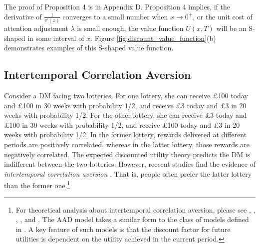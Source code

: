 \documentclass[
  12pt,
]{article}
\begin{document}
The proof of Proposition 4 is in Appendix D. Proposition 4 implies, if
the derivative of \(\frac{1}{v'(x)}\) converges to a small number when
\(x\rightarrow 0^+\), or the unit cost of attention adjustment
\(\lambda\) is small enough, the value function \(U(x,T)\) will be an
S-shaped in some interval of \(x\). Figure
\ref{fig:discount_value_function}(b) demonstrates examples of this
S-shaped value function.

\hypertarget{intertemporal-correlation-aversion}{%
\subsection{Intertemporal Correlation
Aversion}\label{intertemporal-correlation-aversion}}

Consider a DM facing two lotteries. For one lottery, she can receive
£100 today and £100 in 30 weeks with probability 1/2, and receive £3
today and £3 in 20 weeks with probability 1/2. For the other lottery,
she can receive £3 today and £100 in 30 weeks with probability 1/2, and
receive £100 today and £3 in 20 weeks with probability 1/2. In the
former lottery, rewards delivered at different periods are positively
correlated, whereas in the latter lottery, those rewards are negatively
correlated. The expected discounted utility theory predicts the DM is
indifferent between the two lotteries. However, reccent studies find the
evidence of \emph{intertemporal correlation aversion}
\citep{andersen2018multiattribute, rohde2023intertemporal}. That is,
people often prefer the latter lottery than the former one.\footnote{For
  theoretical analysis about intertemporal correlation aversion, please
  see \citet{epstein1983stationary}, \citet{epstein1989substitution},
  \citet{weil1990nonexpected}, \citet{bommier2005risk}, and
  \citet{bommier2017monotone}. The AAD model takes a similar form to the
  class of models defined in \citet{epstein1983stationary}. A key
  feature of such models is that the discount factor for future
  utilities is dependent on the utility achieved in the current period.}
\end{document}

